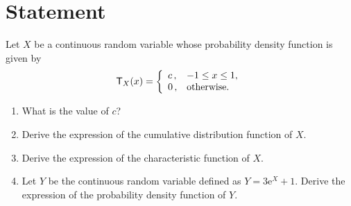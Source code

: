 \documentclass[11pt]{article}
\newcommand{\pdf}{\mathsf{T}}
\begin{document}
\section{Statement}
Let $X$ be a continuous random variable whose probability density function is given by
\begin{equation}
\pdf_X(x) = \left\{ \begin{array}{l@{\quad}l} c\,, & -1 \le x \le 1, \\ 0\,, &  \textnormal{otherwise.} \end{array}\right.
\end{equation}
\begin{enumerate}
	\item What is the value of $c$?
	\item Derive the expression of the cumulative distribution function of $X$.
	\item Derive the expression of the characteristic function of $X$.
	\item Let $Y$ be the continuous random variable defined as $Y = 3 \mathrm{e}^X + 1$.
	Derive the expression of the probability density function of $Y$.
\end{enumerate}
\end{document}
